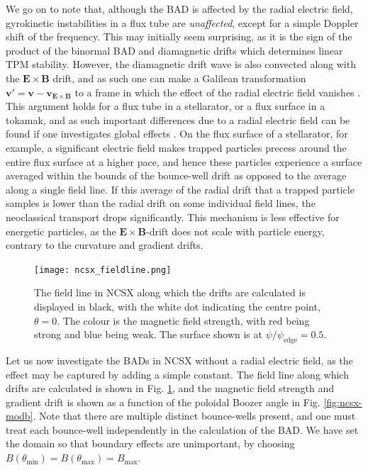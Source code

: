 We go on to note that, although the BAD is affected by the radial electric field, gyrokinetic instabilities in a flux tube are \emph{unaffected}, except for a simple Doppler shift of the frequency. This may initially seem surprising, as it is the sign of the product of the binormal BAD and diamagnetic drifts which determines linear TPM stability. However, the diamagnetic drift wave is also convected along with the $\mathbf{E} \times \mathbf{B}$ drift, and as such one can make a Galilean transformation $\mathbf{v}' = \mathbf{v} - \mathbf{v}_{\mathbf{E} \times \mathbf{B}}$ to a frame in which the effect of the radial electric field vanishes \cite{antonsen1980kinetic,catto1981generalized,helander2005collisional,helander2013collisionless}. This argument holds for a flux tube in a stellarator, or a flux surface in a tokamak, and as such important differences due to a radial electric field can be found if one investigates global effects \cite{villard2002radial,xanthopoulos2016}. On the flux surface of a stellarator, for example, a significant electric field makes trapped particles precess around the entire flux surface at a higher pace, and hence these particles experience a surface averaged within the bounds of the bounce-well drift as opposed to the average along a single field line. If this average of the radial drift that a trapped particle samples is lower than the radial drift on some individual field lines, the neoclassical transport drops significantly. This mechanism is less effective for energetic particles, as the $\mathbf{E} \times \mathbf{B}$-drift does not scale with particle energy, contrary to the curvature and gradient drifts. \par 
\begin{figure}
\texttt{[image: ncsx\_fieldline.png]}%
\caption{\label{fig:ncsx-fieldline} The field line in NCSX along which the drifts are calculated is displayed in black, with the white dot indicating the centre point, $\theta=0$. The colour is the magnetic field strength, with red being strong and blue being weak. The surface shown is at $\psi/\psi_\mathrm{edge}=0.5$.} 
\end{figure}
Let us now investigate the BADs in NCSX without a radial electric field, as the effect may be captured by adding a simple constant. The field line along which drifts are calculated is shown in Fig. \ref{fig:ncsx-fieldline}, and the magnetic field strength and gradient drift is shown as a function of the poloidal Boozer angle in Fig. \ref{fig:ncsx-modb}. Note that there are multiple distinct bounce-wells present, and one must treat each bounce-well independently in the calculation of the BAD. We have set the domain so that boundary effects are unimportant, by choosing $B(\theta_\mathrm{min})=B(\theta_\mathrm{max})=B_\mathrm{max}$.

